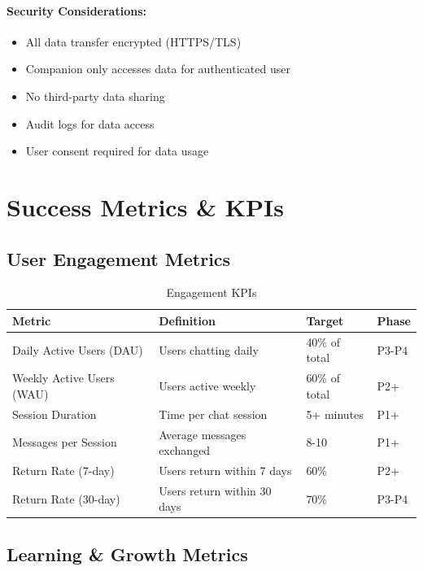 \documentclass[12pt,a4paper]{article}
\begin{document}
\paragraph{Security Considerations:}

\begin{itemize}
    \item All data transfer encrypted (HTTPS/TLS)
    \item Companion only accesses data for authenticated user
    \item No third-party data sharing
    \item Audit logs for data access
    \item User consent required for data usage
\end{itemize}

\section{Success Metrics \& KPIs}

\subsection{User Engagement Metrics}

\begin{table}[h]
\centering
\begin{tabularx}{\textwidth}{|l|X|l|l|}
\hline
\textbf{Metric} & \textbf{Definition} & \textbf{Target} & \textbf{Phase} \\
\hline
Daily Active Users (DAU) & Users chatting daily & 40\% of total & P3-P4 \\
\hline
Weekly Active Users (WAU) & Users active weekly & 60\% of total & P2+ \\
\hline
Session Duration & Time per chat session & 5+ minutes & P1+ \\
\hline
Messages per Session & Average messages exchanged & 8-10 & P1+ \\
\hline
Return Rate (7-day) & Users return within 7 days & 60\% & P2+ \\
\hline
Return Rate (30-day) & Users return within 30 days & 70\% & P3-P4 \\
\hline
\end{tabularx}
\caption{Engagement KPIs}
\end{table}

\subsection{Learning \& Growth Metrics}
\end{document}
